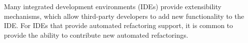 \documentclass[prodmode]{acmlarge}
\begin{document}

Many integrated development environments (IDEs) provide extensibility
mechanisms, which allow third-party developers to add new functionality to the
IDE.  For IDEs that provide automated refactoring support, it is common to
provide the ability to contribute new automated refactorings.
\end{document}
